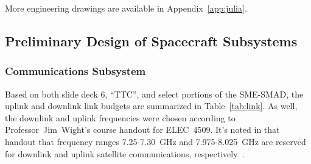 \documentclass[9pt]{article}
\begin{document}
More engineering drawings are available in Appendix~\ref{app:julia}.


\subsection{Preliminary Design of Spacecraft Subsystems}


\subsubsection{Communications Subsystem}
Based on both slide deck 6, ``TTC'', and select portions of the SME-SMAD, the uplink and downlink link budgets are summarized in Table~\ref{tab:link}.
As well, the downlink and uplink frequencies were chosen according to Professor~Jim~Wight's course handout for ELEC~4509.
It's noted in that handout that frequency ranges 7.25-7.30~GHz and 7.975-8.025~GHz are reserved for downlink and uplink satellite communications, respectively~\cite[II, p. 3]{commlinks}.
\end{document}
